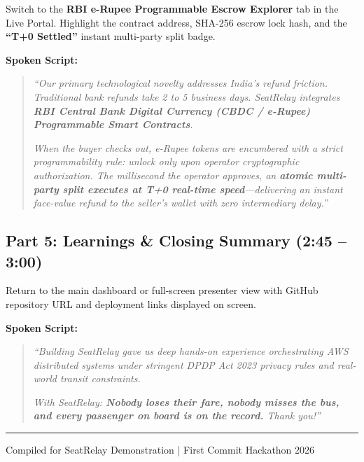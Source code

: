\documentclass[11pt,a4paper]{article}
\begin{document}
\begin{visualcue}
Switch to the \textbf{RBI e-Rupee Programmable Escrow Explorer} tab in the Live Portal. Highlight the contract address, SHA-256 escrow lock hash, and the \textbf{``T+0 Settled''} instant multi-party split badge.
\end{visualcue}

\noindent\textbf{Spoken Script:}
\begin{quote}
\textit{``Our primary technological novelty addresses India's refund friction. Traditional bank refunds take 2 to 5 business days. SeatRelay integrates \textbf{RBI Central Bank Digital Currency (CBDC / e-Rupee) Programmable Smart Contracts}.}

\textit{When the buyer checks out, e-Rupee tokens are encumbered with a strict programmability rule: unlock only upon operator cryptographic authorization. The millisecond the operator approves, an \textbf{atomic multi-party split executes at T+0 real-time speed}---delivering an instant face-value refund to the seller's wallet with zero intermediary delay.''}
\end{quote}

\vspace{0.4em}

\subsection*{Part 5: Learnings \& Closing Summary (2:45 -- 3:00)}

\begin{visualcue}
Return to the main dashboard or full-screen presenter view with GitHub repository URL and deployment links displayed on screen.
\end{visualcue}

\noindent\textbf{Spoken Script:}
\begin{quote}
\textit{``Building SeatRelay gave us deep hands-on experience orchestrating AWS distributed systems under stringent DPDP Act 2023 privacy rules and real-world transit constraints.}

\textit{With SeatRelay: \textbf{Nobody loses their fare, nobody misses the bus, and every passenger on board is on the record.} Thank you!''}
\end{quote}

\vspace{0.8em}
\hrule
\vspace{0.4em}
\begin{center}
\small\textcolor{cuecolor}{Compiled for SeatRelay Demonstration | First Commit Hackathon 2026}
\end{center}
\end{document}
